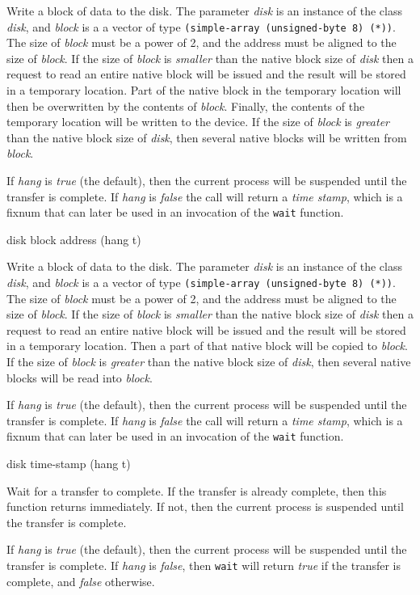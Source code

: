 Write a block of data to the disk.  The parameter \textit{disk} is an
instance of the class \textit{disk}, and \textit{block} is a a vector
of type \texttt{(simple-array (unsigned-byte 8) (*))}.  The size of
\textit{block} must be a power of 2, and the address must be aligned
to the size of \textit{block}.  If the size of \textit{block} is
\emph{smaller} than the native block size of \textit{disk} then a
request to read an entire native block will be issued and the result
will be stored in a temporary location.  Part of the native block in
the temporary location will then be overwritten by the contents of
\textit{block}.  Finally, the contents of the temporary location will
be written to the device.  If the size of \textit{block} is
\emph{greater} than the native block size of \textit{disk}, then
several native blocks will be written from \textit{block}.

If \textit{hang} is \emph{true} (the default), then the current
process will be suspended until the transfer is complete.
If \textit{hang} is \emph{false} the call will return a \emph{time
  stamp}, which is a fixnum that can later be used in an invocation of
the \texttt{wait} function.

 {disk block address \key (hang t)}

Write a block of data to the disk.  The parameter \textit{disk} is an
instance of the class \textit{disk}, and \textit{block} is a a vector
of type \texttt{(simple-array (unsigned-byte 8) (*))}.  The size of
\textit{block} must be a power of 2, and the address must be aligned
to the size of \textit{block}.  If the size of \textit{block} is
\emph{smaller} than the native block size of \textit{disk} then a
request to read an entire native block will be issued and the result
will be stored in a temporary location.  Then a part of that native
block will be copied to \textit{block}.  If the size of \textit{block}
is \emph{greater} than the native block size of \textit{disk}, then
several native blocks will be read into \textit{block}.

If \textit{hang} is \emph{true} (the default), then the current
process will be suspended until the transfer is complete.
If \textit{hang} is \emph{false} the call will return a \emph{time
  stamp}, which is a fixnum that can later be used in an invocation of
the \texttt{wait} function.

 {disk time-stamp \key (hang t)}

Wait for a transfer to complete.  If the transfer is already complete,
then this function returns immediately.  If not, then the current
process is suspended until the transfer is complete. 

If \textit{hang} is \emph{true} (the default), then the current
process will be suspended until the transfer is complete.
If \textit{hang} is \emph{false}, then \texttt{wait} will return
\emph{true} if the transfer is complete, and \emph{false} otherwise. 
